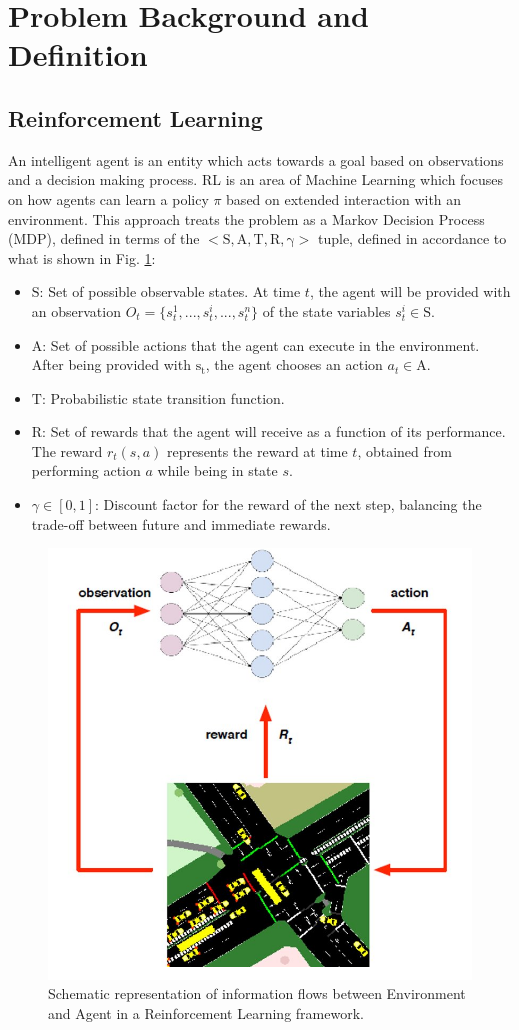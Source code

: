 \documentclass{article}
\begin{document}
\section{Problem Background and Definition} \label{problem}
\subsection{Reinforcement Learning}
An intelligent agent is an entity which acts towards a goal based on observations and a decision making process. RL is an area of Machine Learning which focuses on how agents can learn a policy $\pi$ based on extended interaction with an environment.
This approach treats the problem as a Markov Decision Process (MDP), defined in terms of the  $\mathrm{<S, A, T, R, \gamma>}$ tuple, defined in accordance to what is shown in Fig. \ref{fig:RL}:
\begin{itemize}
    \item $\mathrm{S}$: Set of possible observable states. At time $t$, the agent will be provided with an observation $O_t=\{s^1_t, ..., s^i_t, ..., s^n_t\}$ of the state variables $s^i_t \in \mathrm{S}$.
    
    \item $\mathrm{A}$: Set of possible actions that the agent can execute in the environment. After being provided with $\mathrm{s_t}$, the agent chooses an action $a_t \in \mathrm{A}$.
    
    \item $\mathrm{T}$: Probabilistic state transition function.
    
    \item $\mathrm{R}$: Set of rewards that the agent will receive as a function of its performance. The reward $r_t(s,a)$ represents the reward at time $t$, obtained from performing action $a$ while being in state $s$.
    
    \item $\gamma \in [0,1]$: Discount factor for the reward of the next step, balancing the trade-off between future and immediate rewards.
\end{itemize}

\begin{figure}[thpb]
    \centering
    \includegraphics[width=.5\linewidth]{figures/rl.PNG}
    \caption{Schematic representation of information flows between Environment and Agent in a Reinforcement Learning framework.}
    \label{fig:RL}
\end{figure}
\end{document}
